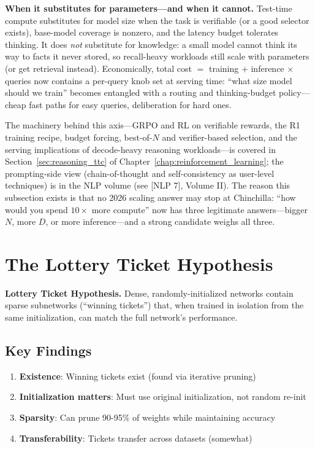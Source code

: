 \textbf{When it substitutes for parameters---and when it cannot.} Test-time compute substitutes for model size when the task is verifiable (or a good selector exists), base-model coverage is nonzero, and the latency budget tolerates thinking. It does \textit{not} substitute for knowledge: a small model cannot think its way to facts it never stored, so recall-heavy workloads still scale with parameters (or get retrieval instead). Economically, total cost $=$ training $+$ inference $\times$ queries now contains a per-query knob set at serving time: ``what size model should we train'' becomes entangled with a routing and thinking-budget policy---cheap fast paths for easy queries, deliberation for hard ones.

The machinery behind this axis---GRPO and RL on verifiable rewards, the R1 training recipe, budget forcing, best-of-$N$ and verifier-based selection, and the serving implications of decode-heavy reasoning workloads---is covered in Section~\ref{sec:reasoning_ttc} of Chapter~\ref{chap:reinforcement_learning}; the prompting-side view (chain-of-thought and self-consistency as user-level techniques) is in the NLP volume (see [NLP 7], Volume II). The reason this subsection exists is that no 2026 scaling answer may stop at Chinchilla: ``how would you spend $10\times$ more compute'' now has three legitimate answers---bigger $N$, more $D$, or more inference---and a strong candidate weighs all three.

\section{The Lottery Ticket Hypothesis}
\label{sec:lottery_ticket}

\textbf{Lottery Ticket Hypothesis.} Dense, randomly-initialized networks contain sparse subnetworks (``winning tickets'') that, when trained in isolation from the same initialization, can match the full network's performance.

\subsection{Key Findings}

\begin{enumerate}
    \item \textbf{Existence}: Winning tickets exist (found via iterative pruning)
    \item \textbf{Initialization matters}: Must use original initialization, not random re-init
    \item \textbf{Sparsity}: Can prune 90-95\% of weights while maintaining accuracy
    \item \textbf{Transferability}: Tickets transfer across datasets (somewhat)
\end{enumerate}

